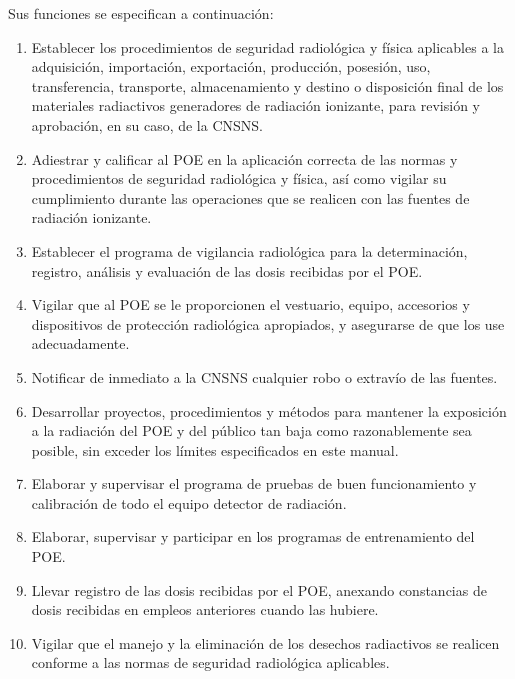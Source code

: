 Sus funciones se especifican a continuación:
\begin{enumerate}[label=\roman*)]
  \item Establecer los procedimientos de seguridad radiológica y física aplicables a la adquisición, importación, exportación, producción, posesión, uso, transferencia, transporte, almacenamiento y destino o disposición final de los materiales radiactivos generadores de radiación ionizante, para revisión y aprobación, en su caso, de la CNSNS.

  \item Adiestrar y calificar al POE en la aplicación correcta de las normas y procedimientos de seguridad radiológica y física, así como vigilar su cumplimiento durante las operaciones que se realicen con las fuentes de radiación ionizante.

  \item Establecer el programa de vigilancia radiológica para la determinación, registro, análisis y evaluación de las dosis recibidas por el POE.

  \item Vigilar que al POE se le proporcionen el vestuario, equipo, accesorios y dispositivos de protección radiológica apropiados, y asegurarse de que los use adecuadamente.

  \item Notificar de inmediato a la CNSNS cualquier robo o extravío de las fuentes.

  \item Desarrollar proyectos, procedimientos y métodos para mantener la exposición a la radiación del POE y del público tan baja como razonablemente sea posible, sin exceder los límites especificados en este manual.

  \item Elaborar y supervisar el programa de pruebas de buen funcionamiento y calibración de todo el equipo detector de radiación.

  \item Elaborar, supervisar y participar en los programas de entrenamiento del POE.

  \item Llevar registro de las dosis recibidas por el POE, anexando constancias de dosis recibidas en empleos anteriores cuando las hubiere.

  \item Vigilar que el manejo y la eliminación de los desechos radiactivos se realicen conforme a las normas de seguridad radiológica aplicables.


\end{enumerate}
